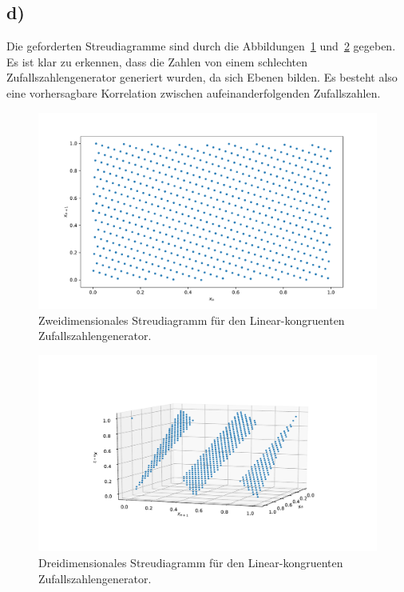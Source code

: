 \documentclass[a4paper, 11pt]{article}
\begin{document}
\subsection*{d)}
Die geforderten Streudiagramme sind durch die Abbildungen~\ref{fig:a9d_2d} und~\ref{fig:a9d_3d} gegeben. Es ist klar zu erkennen, dass die Zahlen von einem schlechten Zufallszahlengenerator generiert wurden, da sich Ebenen bilden. Es besteht also eine vorhersagbare Korrelation zwischen aufeinanderfolgenden Zufallszahlen.
\begin{figure}
    \centering
    \includegraphics[width=\textwidth]{../A09/A9d_2D.pdf}
    \caption{Zweidimensionales Streudiagramm für den Linear-kongruenten Zufallszahlengenerator.}
    \label{fig:a9d_2d}
\end{figure}
\begin{figure}
    \centering
    \includegraphics[width=\textwidth]{../A09/A9d_3D.pdf}
    \caption{Dreidimensionales Streudiagramm für den Linear-kongruenten Zufallszahlengenerator.}
    \label{fig:a9d_3d}
\end{figure}
\FloatBarrier
\end{document}
